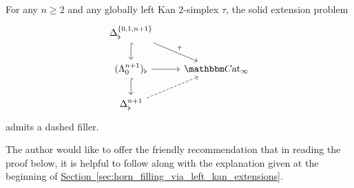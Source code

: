 \documentclass[main.tex]{subfiles}
\begin{document}
\begin{theorem}
  For any $n \geq 2$ and any globally left Kan $2$-simplex $\tau$, the solid extension problem
  \begin{equation*}
    \begin{tikzcd}
      \Delta^{\{0, 1, n+1\}}_{\flat}
      \arrow[d, hook]
      \arrow[dr, "\tau"]
      \\
      (\Lambda^{n+1}_{0})_{\flat}
      \arrow[r]
      \arrow[d, hook]
      & \ICCat
      \\
      \Delta^{n+1}_{\flat}
      \arrow[ur, dashed]
    \end{tikzcd}
  \end{equation*}
  admits a dashed filler.
\end{theorem}

\begin{note}
  The author would like to offer the friendly recommendation that in reading the proof below, it is helpful to follow along with the explanation given at the beginning of \hyperref[sec:horn_filling_via_left_kan_extensions]{Section~\ref*{sec:horn_filling_via_left_kan_extensions}}.
\end{note}
\end{document}
